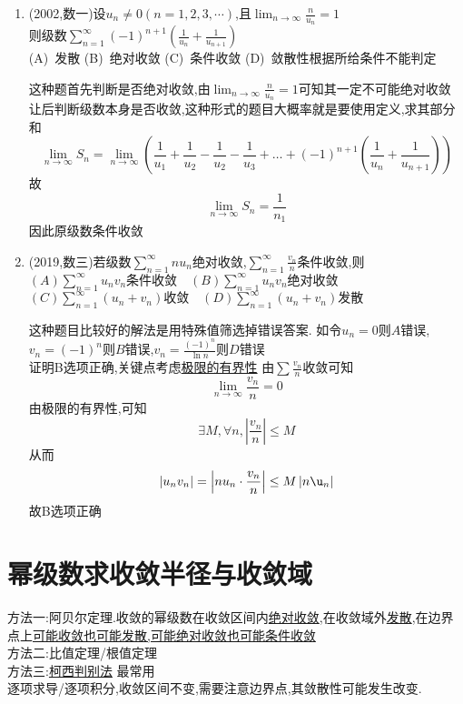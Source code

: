 \documentclass[12pt, a4paper, oneside, UTF8]{ctexbook}
\begin{document}
\begin{enumerate}[label=\arabic*.,start=4]
    \item (2002,数一)设$u_n\neq 0(n=1,2,3,\cdots)$,且$\displaystyle\lim_{n\rightarrow\infty}\frac{n}{u_n}=1$ \\
    则级数$\displaystyle\sum_{n=1}^{\infty}(-1)^{n+1}\left(\frac{1}{u_n}+\frac{1}{u_{n+1}}\right)$ \\
    (A)\ 发散 \quad (B)\ 绝对收敛 \quad (C)\ 条件收敛 \quad (D)\ 敛散性根据所给条件不能判定
    
    \begin{solution}
    这种题首先判断是否绝对收敛,由$\displaystyle \lim_{n\to\infty}\frac{n}{u_n}=1$可知其一定不可能绝对收敛 \\
    让后判断级数本身是否收敛,这种形式的题目大概率就是要使用定义,求其部分和
    $$
        \lim_{n\to\infty}S_n=\lim_{n\to\infty}\left(\frac{1}{u_1}+\frac{1}{u_2}-\frac{1}{u_2}-\frac{1}{u_3}+\ldots+(-1)^{n+1}(\frac{1}{u_n}+\frac{1}{u_{n+1}})\right) 
    $$
    故
    $$
        \lim_{n\to\infty}S_n = \frac{1}{n_1} 
    $$
    因此原级数条件收敛
    \end{solution}
    
    \item (2019,数三)若级数$\displaystyle\sum_{n=1}^{\infty}nu_n$绝对收敛,$\displaystyle\sum_{n=1}^{\infty}\frac{v_n}{n}$条件收敛,则 \\
    $\displaystyle(A)\sum_{n=1}^{\infty} u_n v_n\text{条件收敛} \quad (B)\sum_{n=1}^{\infty} u_n v_n\text{绝对收敛}$ \\
    $\displaystyle(C)\sum_{n=1}^{\infty}\left(u_n+v_n\right)\text{收敛} \quad (D)\sum_{n=1}^{\infty}\left(u_n+v_n\right)\text{发散}$
    
    
    \begin{solution}
    这种题目比较好的解法是用特殊值筛选掉错误答案. 如令$u_n=0$则$A$错误,$v_n=(-1)^n$则$B$错误,$v_n=\frac{(-1)^n}{\ln{n}}$则$D$错误 \\
    证明B选项正确,关键点考虑\underline{极限的有界性} 由$\sum\frac{v_n}{n}$收敛可知 
    $$
        \lim_{n\to\infty}\frac{v_n}{n}= 0
    $$
    由极限的有界性,可知 
    $$
    \exists M, \forall n, \left|\frac{v_n}{n}\right|\leq M 
    $$
    从而
    $$
    \left|u_nv_n\right| = \left|nu_n\cdot\frac{v_n}{n}\right| \leq M\left|n\u_n\right|
    $$
    故B选项正确
    \end{solution}
\end{enumerate}

\section{幂级数求收敛半径与收敛域}
\begin{remark}
    方法一:阿贝尔定理.收敛的幂级数在收敛区间内\underline{绝对收敛},在收敛域外\underline{发散},在边界点上\underline{可能收敛也可能发散,可能绝对收敛也可能条件收敛} \\
    方法二:比值定理/根值定理 \\
    方法三:\underline{柯西判别法} 最常用 \\
    逐项求导/逐项积分,{\color{red}收敛区间不变},需要注意边界点,其敛散性可能发生改变.
\end{remark}
\end{document}
